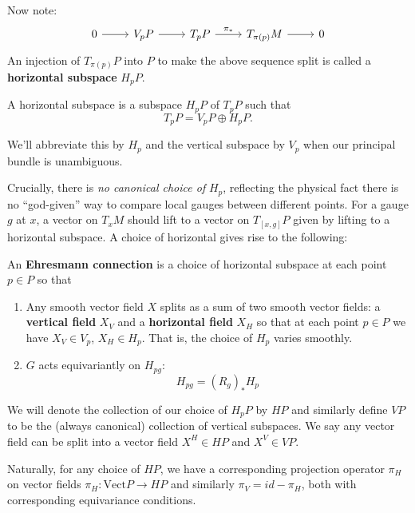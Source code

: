 		Now note:
		\[
		\begin{tikzcd}
			0 \arrow{r} & V_p P \arrow{r} & T_p P \arrow[r,"\pi_*"] & T_{\pi(p)}M \arrow{r} & 0
		\end{tikzcd}	
		\]
		An injection of $T_{\pi(p)} P$ into $P$ to make the above sequence split is called a \textbf{horizontal subspace} $H_pP$. 
		\begin{defn}
			A horizontal subspace is a subspace $H_p P$ of $T_p P$ such that
			\begin{equation}
				T_p P = V_p P \oplus H_p P.
			\end{equation}
		\end{defn}
		 We'll abbreviate this by $H_p$ and the vertical subspace by $V_p$ when our principal bundle is unambiguous.
	 
		Crucially, there is \emph{no canonical choice of} $H_p$, reflecting the physical fact there is no ``god-given'' way to compare local gauges between different points. For a gauge $g$ at $x$, a vector on $T_x M$ should lift to a vector on $T_{[x,g]} P$ given by lifting to a horizontal subspace. A choice of horizontal gives rise to the following:
		\begin{defn}
		An \textbf{Ehresmann connection} is a choice of horizontal subspace at each point $p \in P$ so that
			\begin{enumerate}
				\item Any smooth vector field $X$ splits as a sum of two smooth vector fields: a \textbf{vertical field} $X_V$ and a \textbf{horizontal field} $X_H$ so that at each point $p \in P$ we have $X_V \in V_p$, $X_H \in H_p$. That is, the choice of $H_p$ varies smoothly.
				\item $G$ acts equivariantly on $H_{pg}$:
				\begin{equation}
					H_{pg} = (R_{g})_* H_p
				\end{equation}
			\end{enumerate}
		\end{defn}
	
		We will denote the collection of our choice of $H_p P$ by $HP$ and similarly define $VP$ to be the (always canonical) collection of vertical subspaces. We say any vector field can be split into a vector field $X^H \in HP$ and $X^V \in VP$.
	
		Naturally, for any choice of $HP$, we have a corresponding projection operator $\pi_H$ on vector fields $\pi_H: \mathrm{Vect}P \rightarrow HP$  and similarly $\pi_V = id - \pi_H$, both with corresponding equivariance conditions.
	
